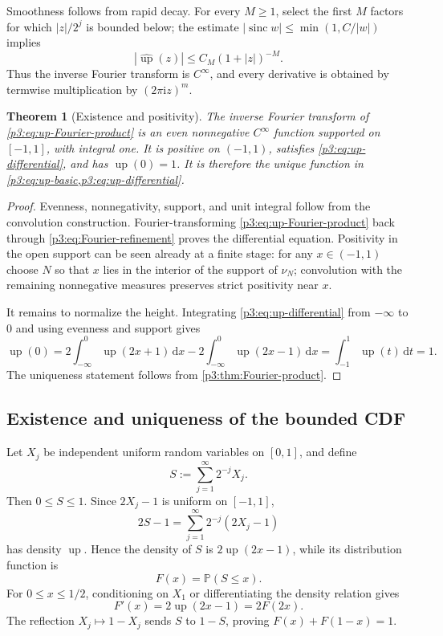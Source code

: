 \documentclass[11pt]{article}
\numberwithin{equation}{section}
\newtheorem{theorem}{Theorem}[section]
\theoremstyle{definition}
\theoremstyle{remark}
\newcommand{\upf}{\operatorname{up}}
\newcommand{\sinc}{\operatorname{sinc}}
\newcommand{\dd}{\,\mathrm d}
\newcommand{\ii}{\mathrm i}
\begin{document}
Smoothness follows from rapid decay.  For every $M\ge1$, select the first $M$ factors for which $|z|/2^j$ is bounded below; the estimate $|\sinc w|\le\min(1,C/|w|)$ implies
\begin{equation}\label{p3:eq:rapid-decay}
 |\widehat{\upf}(z)|\le C_M(1+|z|)^{-M}.
\end{equation}
Thus the inverse Fourier transform is $C^\infty$, and every derivative is obtained by termwise multiplication by $(2\pi\ii z)^m$.

\begin{theorem}[Existence and positivity]\label{p3:thm:existence-positivity}
The inverse Fourier transform of \eqref{p3:eq:up-Fourier-product} is an even nonnegative $C^\infty$ function supported on $[-1,1]$, with integral one.  It is positive on $(-1,1)$, satisfies \eqref{p3:eq:up-differential}, and has $\upf(0)=1$.  It is therefore the unique function in \cref{p3:eq:up-basic,p3:eq:up-differential}.
\end{theorem}

\begin{proof}
Evenness, nonnegativity, support, and unit integral follow from the convolution construction.  Fourier-transforming \eqref{p3:eq:up-Fourier-product} back through \eqref{p3:eq:Fourier-refinement} proves the differential equation.  Positivity in the open support can be seen already at a finite stage: for any $x\in(-1,1)$ choose $N$ so that $x$ lies in the interior of the support of $\nu_N$; convolution with the remaining nonnegative measures preserves strict positivity near $x$.

It remains to normalize the height.  Integrating \eqref{p3:eq:up-differential} from $-\infty$ to $0$ and using evenness and support gives
\[
 \upf(0)=2\int_{-\infty}^{0}\upf(2x+1)\dd x
       -2\int_{-\infty}^{0}\upf(2x-1)\dd x
       =\int_{-1}^{1}\upf(t)\dd t=1.
\]
The uniqueness statement follows from \cref{p3:thm:Fourier-product}.
\end{proof}

\subsection{Existence and uniqueness of the bounded CDF}

Let $X_j$ be independent uniform random variables on $[0,1]$, and define
\begin{equation}\label{p3:eq:random-S}
 S:=\sum_{j=1}^{\infty}2^{-j}X_j.
\end{equation}
Then $0\le S\le1$.  Since $2X_j-1$ is uniform on $[-1,1]$,
\[
 2S-1=\sum_{j=1}^{\infty}2^{-j}(2X_j-1)
\]
has density $\upf$.  Hence the density of $S$ is $2\upf(2x-1)$, while its distribution function is
\begin{equation}\label{p3:eq:F-probability}
 F(x)=\mathbb P(S\le x).
\end{equation}
For $0\le x\le1/2$, conditioning on $X_1$ or differentiating the density relation gives
\[
 F'(x)=2\upf(2x-1)=2F(2x).
\]
The reflection $X_j\mapsto1-X_j$ sends $S$ to $1-S$, proving $F(x)+F(1-x)=1$.
\end{document}
